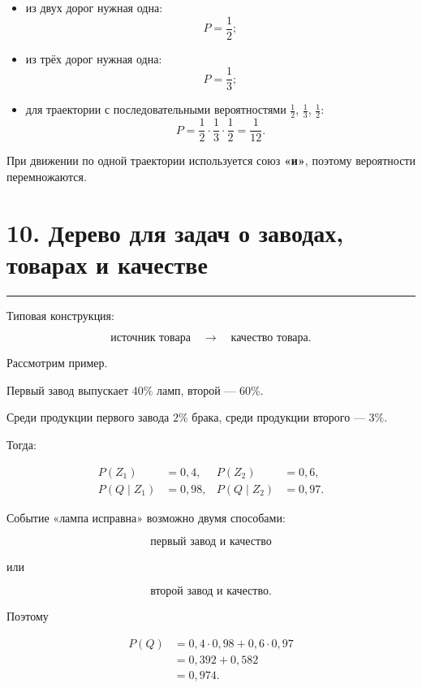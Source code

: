 \documentclass[a4paper,12pt]{article}
\newcommand{\accentline}{%
    \vspace{0.3em}
    {\color{accent}\rule{\linewidth}{0.7pt}}
    \vspace{0.5em}
}
\newcommand{\important}[1]{\textbf{\color{darkaccent}#1}}
\begin{document}
\begin{itemize}
    \item из двух дорог нужная одна:
    \[
    P=\frac12;
    \]

    \item из трёх дорог нужная одна:
    \[
    P=\frac13;
    \]

    \item для траектории с последовательными вероятностями
    $\frac12$, $\frac13$, $\frac12$:
    \[
    P
    =
    \frac12\cdot\frac13\cdot\frac12
    =
    \frac1{12}.
    \]
\end{itemize}

При движении по одной траектории используется союз \important{«и»}, поэтому
вероятности перемножаются.


\section*{\color{darkaccent}10. Дерево для задач о заводах, товарах и качестве}
\accentline

Типовая конструкция:

\[
\text{источник товара}
\quad\longrightarrow\quad
\text{качество товара}.
\]

Рассмотрим пример.

Первый завод выпускает $40\%$ ламп, второй --- $60\%$.

Среди продукции первого завода $2\%$ брака, среди продукции второго ---
$3\%$.

Тогда:

\[
\begin{aligned}
P(Z_1)&=0,4,
&
P(Z_2)&=0,6,
\\
P(Q\mid Z_1)&=0,98,
&
P(Q\mid Z_2)&=0,97.
\end{aligned}
\]

Событие «лампа исправна» возможно двумя способами:

\[
\text{первый завод и качество}
\]

или

\[
\text{второй завод и качество}.
\]

Поэтому

\[
\begin{aligned}
P(Q)
&=
0,4\cdot0,98
+
0,6\cdot0,97
\\
&=
0,392+0,582
\\
&=
0,974.
\end{aligned}
\]
\end{document}

